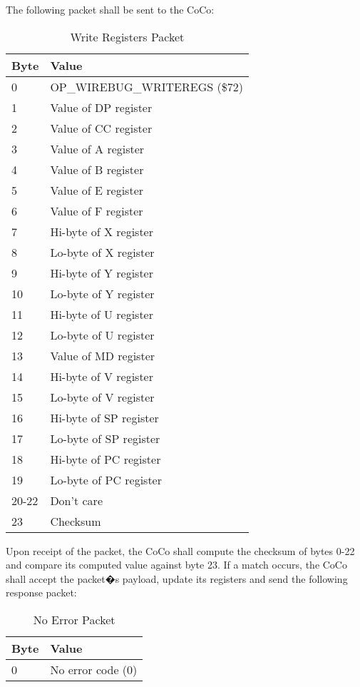 \documentclass{article}
\begin{document}
The following packet shall be sent to the CoCo:

\begin{table}[ht]
\caption{Write Registers Packet}
\begin{center}
\begin{tabular}{|ll|}
\hline
Byte & Value \\ \hline
0 & OP\_WIREBUG\_WRITEREGS (\$72) \\
1 & Value of DP register \\
2 & Value of CC register \\
3 & Value of A register \\
4 & Value of B register \\
5 & Value of E register \\
6 & Value of F register \\
7 & Hi-byte of X register \\
8 & Lo-byte of X register \\
9 & Hi-byte of Y register \\
10 & Lo-byte of Y register \\
11 & Hi-byte of U register \\
12 & Lo-byte of U register \\
13 & Value of MD register \\
14 & Hi-byte of V register \\
15 & Lo-byte of V register \\
16 & Hi-byte of SP register \\
17 & Lo-byte of SP register \\
18 & Hi-byte of PC register \\
19 & Lo-byte of PC register \\
20-22 & Don't care \\
23 & Checksum \\
\hline
\end{tabular}
\end{center}
\end{table}

Upon receipt of the packet, the CoCo shall compute the checksum of bytes 0-22 and compare its computed value against byte 23.	If a match occurs, the CoCo shall accept the packet�s payload, update its registers and send the following response packet:

\begin{table}[ht]
\caption{No Error Packet}
\begin{center}
\begin{tabular}{|ll|}
\hline
Byte & Value \\ \hline
0 & No error code (0) \\
\hline
\end{tabular}
\end{center}
\end{table}
\end{document}
